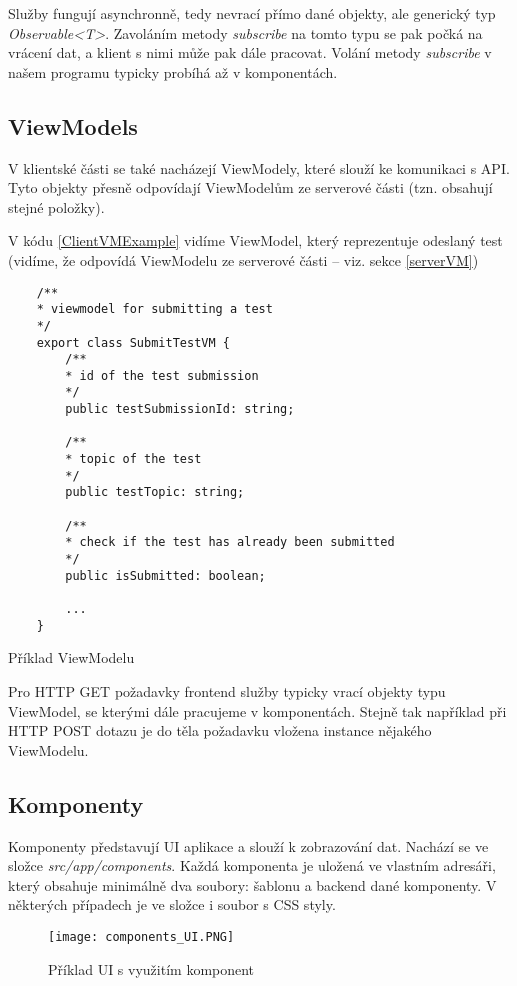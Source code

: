 Služby fungují asynchronně, tedy nevrací přímo dané objekty, ale generický typ \textit{Observable<T>}. Zavoláním metody \textit{subscribe} na tomto typu se pak počká na vrácení dat, a klient s nimi může pak dále pracovat.
Volání metody \textit{subscribe} v našem programu typicky probíhá až v komponentách.


\subsection{ViewModels}
\label{clientVM}

V klientské části se také nacházejí ViewModely, které slouží ke komunikaci s API. Tyto objekty přesně odpovídají ViewModelům ze serverové části (tzn. obsahují stejné položky).

V kódu \ref{ClientVMExample} vidíme ViewModel, který reprezentuje odeslaný test (vidíme, že odpovídá ViewModelu ze serverové části -- viz. sekce \ref{serverVM})

\begin{program}
	\begin{lstlisting}
	/**
	* viewmodel for submitting a test
	*/
	export class SubmitTestVM {
		/**
		* id of the test submission
		*/
		public testSubmissionId: string;
		
		/**
		* topic of the test
		*/
		public testTopic: string;
		
		/**
		* check if the test has already been submitted
		*/
		public isSubmitted: boolean;
		
		...
	}
	\end{lstlisting}
	\caption{Příklad ViewModelu}
	\label{ClientVMExample}
\end{program}

Pro HTTP GET požadavky frontend služby typicky vrací objekty typu ViewModel, se kterými dále pracujeme v komponentách. Stejně tak například při HTTP POST dotazu je do těla požadavku vložena instance nějakého ViewModelu.

\subsection{Komponenty}

Komponenty představují UI aplikace a slouží k zobrazování dat. Nachází se ve složce \textit{src/app/components}. Každá komponenta je uložená ve vlastním adresáři, který obsahuje minimálně dva soubory: šablonu a backend dané komponenty. V některých případech je ve složce i soubor s CSS styly.

\begin{figure}
	\centering
	\texttt{[image: components\_UI.PNG]}
	\caption{Příklad UI s využitím komponent}
	\label{fig:Components}
\end{figure}

